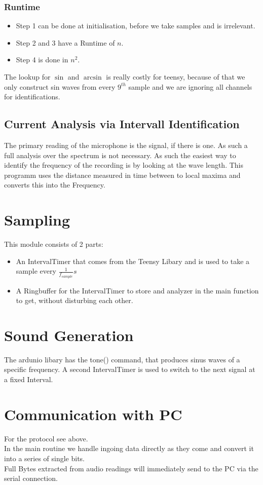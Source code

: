 \documentclass{book}
\begin{document}
\subsubsection{Runtime}
\begin{itemize}
\item Step 1 can be done at initialisation, before we take samples and is irrelevant.
\item Step 2 and 3 have a Runtime of $n$.
\item Step 4 is done in $n^2$.
\end{itemize}
The lookup for $\sin$ and $\arcsin$ is really costly for teensy, because of that we only construct sin waves from every $9^{th}$ sample and we are ignoring all channels for identifications.

\subsection{Current Analysis via Intervall Identification}
The primary reading of the microphone is the signal, if there is one. As such a full analysis over the spectrum is not necessary. As such the easiest way to identify the frequency of the recording is by looking at the wave length. This programm uses the distance measured in time between to local maxima and converts this into the Frequency.

\section{Sampling}
This module consists of 2 parts:
\begin{itemize}
\item An IntervalTimer that comes from the Teensy Libary and is used to take a sample every $\frac{1}{f_{sample}}s$
\item A Ringbuffer for the IntervalTimer to store and analyzer in the main function to get, without disturbing each other.
\end{itemize}

\section{Sound Generation}
The ardunio libary has the tone() command, that produces sinus waves of a specific frequency. A second IntervalTimer is used to switch to the next signal at a fixed Interval.

\section{Communication with PC}
For the protocol see above.
\\In the main routine we handle ingoing data directly as they come and convert it into a series of single bits.
\\Full Bytes extracted from audio readings will immediately send to the PC via the serial connection.
\end{document}
